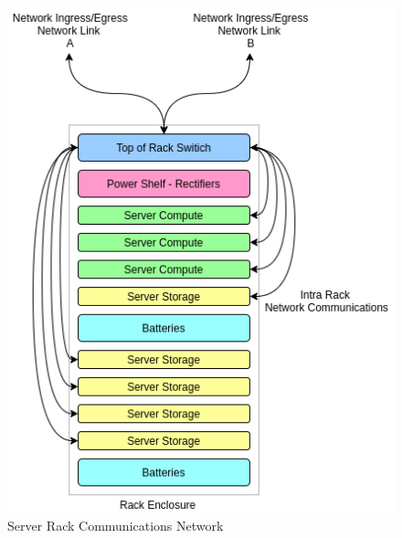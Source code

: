 \begin{figure} [!h]
\centering
\includegraphics[scale=.5]{methodology/images/Server Rack.png}
\caption[Server Rack Communications Network]{Server Rack Communications Network}
\label{img_server_rack}
\end{figure}